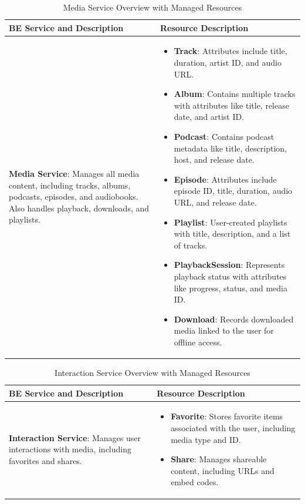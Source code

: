 \documentclass[a4paper,12pt]{article}
\begin{document}
\begin{table}[H]
    \centering
    \renewcommand{\arraystretch}{1.5}
    \begin{tabular}{|>{\centering\arraybackslash}m{4cm}|m{10cm}|}
    \hline
    \textbf{BE Service and Description} & \textbf{Resource Description} \\
    \hline
    \textbf{Media Service}: Manages all media content, including tracks, albums, podcasts, episodes, and audiobooks. Also handles playback, downloads, and playlists. & 
    \begin{itemize}[left=0pt]
        \item \textbf{Track}: Attributes include title, duration, artist ID, and audio URL.
        \item \textbf{Album}: Contains multiple tracks with attributes like title, release date, and artist ID.
        \item \textbf{Podcast}: Contains podcast metadata like title, description, host, and release date.
        \item \textbf{Episode}: Attributes include episode ID, title, duration, audio URL, and release date.
        \item \textbf{Playlist}: User-created playlists with title, description, and a list of tracks.
        \item \textbf{PlaybackSession}: Represents playback status with attributes like progress, status, and media ID.
        \item \textbf{Download}: Records downloaded media linked to the user for offline access.
    \end{itemize} \\
    \hline
    \end{tabular}
    \caption{Media Service Overview with Managed Resources}
\end{table}

\begin{table}[H]
    \centering
    \renewcommand{\arraystretch}{1.5}
    \begin{tabular}{|>{\centering\arraybackslash}m{4cm}|m{10cm}|}
    \hline
    \textbf{BE Service and Description} & \textbf{Resource Description} \\
    \hline
    \textbf{Interaction Service}: Manages user interactions with media, including favorites and shares. & 
    \begin{itemize}[left=0pt]
        \item \textbf{Favorite}: Stores favorite items associated with the user, including media type and ID.
        \item \textbf{Share}: Manages shareable content, including URLs and embed codes.
    \end{itemize} \\
    \hline
    \end{tabular}
    \caption{Interaction Service Overview with Managed Resources}
\end{table}
\end{document}
